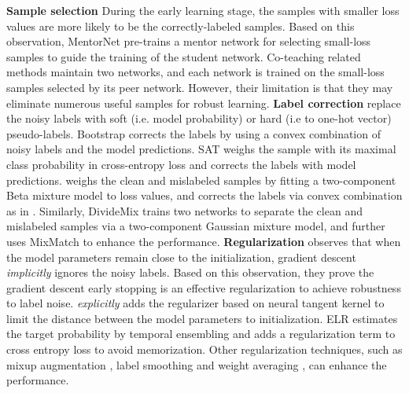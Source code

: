 \documentclass{article}
\begin{document}
\textbf{Sample selection} During the early learning stage, the samples with smaller loss values are more likely to be the correctly-labeled samples. Based on this observation, 
MentorNet \cite{jiang2017mentornet} pre-trains a mentor network for selecting small-loss samples to guide the training of the student network. Co-teaching related methods \cite{han2018co,yu2019does,wei2020combating,lu2021co} maintain two networks, and each network is trained on the small-loss samples selected by its peer network. However, their limitation is that they may eliminate numerous useful samples for robust learning. \textbf{Label correction} \cite{tanaka2018joint,yi2019probabilistic} replace the noisy labels with soft (i.e. model probability) or hard (i.e to one-hot vector) pseudo-labels. Bootstrap \cite{reed2014training} corrects the labels by using a convex combination of noisy labels and the model predictions. SAT \cite{huang2020self} weighs the sample with its maximal class probability in cross-entropy loss and corrects the labels with model predictions. \cite{pmlr-v97-arazo19a} weighs the clean and mislabeled samples by fitting a two-component Beta mixture model to loss values, and corrects the labels via convex combination as in \cite{reed2014training}. Similarly, DivideMix \cite{li2020dividemix} trains two networks to separate the clean and mislabeled samples via a two-component Gaussian mixture model, and further uses MixMatch \cite{berthelot2019mixmatch} to enhance the performance. \textbf{Regularization} \cite{li2020gradient} observes that when the model parameters remain close to the initialization, gradient descent \emph{implicitly} ignores the noisy labels. Based on this observation, they prove the gradient descent early stopping is an effective regularization to achieve robustness to label noise. \cite{hu2019simple} \emph{explicitly} adds the regularizer based on neural tangent kernel \cite{jacot2018neural} to limit the distance between the model parameters to
initialization. ELR \cite{liu2020early} estimates the target probability by temporal ensembling \cite{laine2016temporal} and adds a regularization term to cross entropy loss to avoid memorization. Other regularization techniques, such as mixup augmentation \cite{zhang2017mixup}, label smoothing \cite{pereyra2017regularizing} and weight averaging \cite{tarvainen2017mean}, can enhance the performance. 
\end{document}
